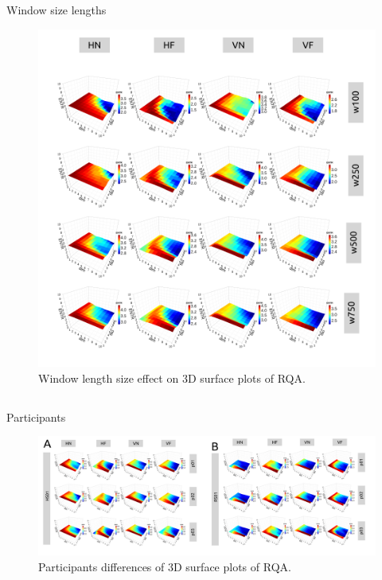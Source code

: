 \subsection{}
{

\begin{frame}{Window size lengths
}
   \begin{figure}
        \includegraphics[width=0.55\linewidth]{./figs/results/3d-rqa-epsilons-windows/versions/drawing-v00}{}
	\caption{Window length size effect on 3D surface plots of RQA.} 
   \end{figure}
	
\end{frame}
}









\subsection{}
{

\begin{frame}{Participants
}
    \begin{figure}
        \includegraphics[width=1.0\linewidth]{./figs/results/3d-rqa-epsilons-participants/versions/drawing-v00}{}
	\caption{Participants differences of 3D surface plots of RQA.} 
   \end{figure}
	
\end{frame}
}


